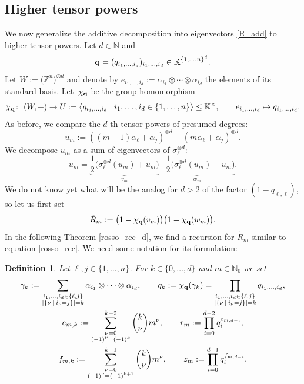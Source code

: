 \documentclass[pdftex]{sigma}
\numberwithin{equation}{section}
\newtheorem{Definition}[Theorem]{Definition}
\newcommand{\NN }{\mathbb{N}}
\newcommand{\ZZ }{\mathbb{Z}}
\newcommand{\qq }{{\bf q}}
\newcommand{\KK }{\mathbb{K}}
\newcommand{\dn }{d}
\newcommand{\qR }{\tilde R}
\newcommand{\bich }{\chi}
\begin{document}
\subsection{Higher tensor powers}\label{generalized_Rosso}
We now generalize the additive decomposition into eigenvectors \eqref{R_add} to higher tensor powers.
Let $\dn\in\NN$ and
\[\qq = (q_{i_1,\dots,i_\dn})_{i_1,\dots,i_\dn}\in \KK^{\{1,\dots,n\}^\dn}.
\]
Let $W:=\big(\ZZ^n\big)^{\otimes \dn}$ and denote by $e_{i_1,\dots,i_\dn}:=\alpha_{i_1}\otimes\cdots\otimes\alpha_{i_\dn}$ the elements of its standard basis.
Let~$\bich_\qq$ be the group homomorphism
\[ \bich_\qq \colon \ (W,+) \rightarrow U:=\big\langle q_{i_1,\dots,i_\dn} \mid i_1,\dots,i_\dn\in \{1,\dots,n\}\big\rangle\le \KK^\times,
\qquad e_{i_1,\dots,i_\dn}\mapsto q_{i_1,\dots,i_\dn}. \]
As before, we compare the $\dn$-th tensor powers of presumed degrees:
\[ u_m := ((m+1)\alpha_\ell+\alpha_j)^{\otimes \dn} - (m\alpha_\ell+\alpha_j)^{\otimes \dn}. \]
We decompose $u_m$ as a sum of eigenvectors of $\sigma_\ell^{\otimes \dn}$:
\[ u_m = \underbrace{\frac{1}{2}\big(\sigma_\ell^{\otimes \dn}(u_m)+u_m\big)}_{v_m}
\underbrace{-\frac{1}{2}\big(\sigma_\ell^{\otimes \dn}(u_m)-u_m\big)}_{w_m}. \]
We do not know yet what will be the analog for $d>2$ of the factor $(1-q_{\ell,\ell})$, so let us first set
\begin{equation*}%
\qR_m := \big(1-\bich_\qq(v_m)\big)\big(1-\bich_\qq(w_m)\big).
\end{equation*}
In the following Theorem \ref{rosso_rec_d}, we find a recursion for $\qR_m$ similar to equation \eqref{rosso_rec}. We need some notation for its formulation:

\begin{Definition}\label{def: defn of qk's}
Let $\ell,j\in\{1,\dots,n\}$.
For $k\in\{0,\dots,\dn\}$ and $m\in\NN_0$ we set
\begin{gather*}
\gamma_k := \sum_{\substack{i_1,\dots,i_\dn\in\{\ell,j\}\\ |\{\nu\:\mid\: i_\nu=j\}|=k}} \alpha_{i_1}\otimes \dots \otimes \alpha_{i_\dn},
\qquad
 q_k :=\chi_\qq(\gamma_k)= \prod_{\substack{i_1,\dots,i_\dn\in\{\ell,j\}\\ |\{\nu\:\mid\: i_\nu=j\}|=k}} q_{i_1,\dots,i_\dn},\\
 e_{m,k}:=\sum_{\substack{\nu=0 \\ (-1)^\nu=(-1)^k}}^{k-2} \binom{k}{\nu} m^\nu,
\qquad
r_m:=\prod_{i=0}^{\dn-2} q_i^{e_{m,\dn-i}},\\
f_{m,k} := \sum_{\substack{\nu=0 \\ (-1)^\nu=(-1)^{k+1}}}^{k-1} \binom{k}{\nu} m^\nu,
\qquad
z_m := \prod_{i=0}^{\dn-1} q_i^{f_{m,\dn-i}}.
\end{gather*}
\end{Definition}
\end{document}

